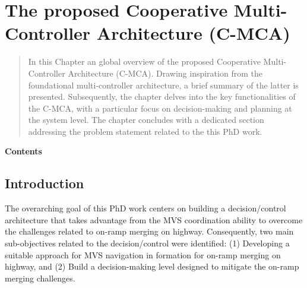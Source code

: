 



\chapter{The proposed Cooperative Multi-Controller Architecture (C-MCA)}

\label{Chap03}
\begin{abstract}
    In this Chapter an global overview of the proposed Cooperative Multi-Controller Architecture (C-MCA). Drawing inspiration from the foundational multi-controller architecture, a brief summary of the latter is presented. Subsequently, the chapter delves into the key functionalities of the C-MCA, with a particular focus on decision-making and planning at the system level. The chapter concludes with a dedicated section addressing the problem statement related to the this PhD work.

    
\end{abstract}


\textbf{Contents}
\vspace{0.15cm}
\hline
\hspace{2cm}
\localtableofcontents
\hspace{2cm}
\hline




 \section{Introduction}


The overarching goal of this PhD work centers on building a decision/control architecture that takes advantage from the MVS coordination ability to overcome the challenges related to on-ramp merging on highway. Consequently, two main sub-objectives related to the decision/control were identified: (1) Developing a suitable approach for MVS navigation in formation for on-ramp merging on highway, and (2) Build a decision-making level designed to mitigate the on-ramp merging challenges. 

